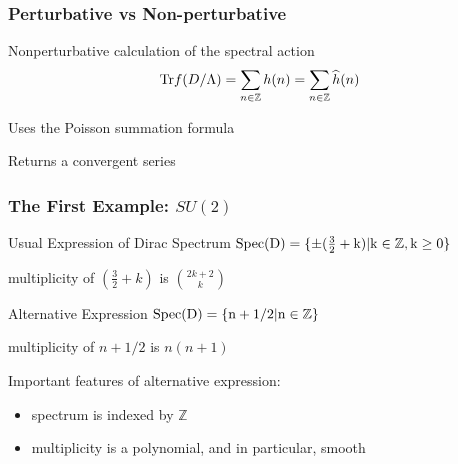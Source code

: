\documentclass{beamer}
\def\Z{{\mathbb Z}}
\def\Tr{{\rm Tr}}
\begin{document}
\begin{frame}
	\frametitle{Perturbative vs Non-perturbative}
	\begin{block}{Nonperturbative calculation of the spectral action}
		\[
			\Tr f (D/\Lambda) = \sum_{n \in \Z} h(n) = \sum_{n \in \Z} \widehat{h}(n)
		\]
	\end{block}

	\pause

	\begin{block}{}
		Uses the Poisson summation formula

		Returns a convergent series
	\end{block}
\end{frame}

\begin{frame}
	\frametitle{The First Example: $SU(2)$}
	\begin{block}{Usual Expression of Dirac Spectrum}
		$\rm{Spec}(D) = \{ \pm (\frac{3}{2} + k) | k \in \Z, k \geq 0\}$

		multiplicity of $(\frac{3}{2} + k)$ is $2 {k+2} \choose {k}$
	\end{block}

	\pause

	\begin{block}{Alternative Expression}
		$\rm{Spec}(D) = \{n + 1/2 | n \in \Z \}$

		multiplicity of $n + 1/2$ is $n(n+1)$
	\end{block}

	\pause

	\begin{block}{}
		Important features of alternative expression:
		\begin{itemize}
			\item spectrum is indexed by $\Z$
			\item multiplicity is a polynomial, and in particular, smooth
		\end{itemize}
	\end{block}
\end{frame}
\end{document}
